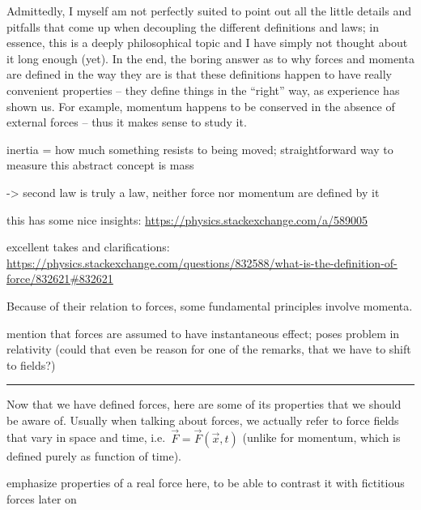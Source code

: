 \documentclass[../class_mech_main.tex]{subfiles}
\begin{document}
Admittedly, I myself am not perfectly suited to point out all the little details and pitfalls that come up when decoupling the different definitions and laws; in essence, this is a deeply philosophical topic and I have simply not thought about it long enough (yet). In the end, the boring answer as to why forces and momenta are defined in the way they are is that these definitions happen to have really convenient properties -- they define things in the \enquote{right} way, as experience has shown us. For example, momentum happens to be conserved in the absence of external forces -- thus it makes sense to study it.


inertia = how much something resists to being moved; straightforward way to measure this abstract concept is mass


-> second law is truly a law, neither force nor momentum are defined by it


this has some nice insights: \url{https://physics.stackexchange.com/a/589005}


excellent takes and clarifications: \url{https://physics.stackexchange.com/questions/832588/what-is-the-definition-of-force/832621#832621}



Because of their relation to forces, some fundamental principles involve momenta. 



mention that forces are assumed to have instantaneous effect; poses problem in relativity (could that even be reason for one of the remarks, that we have to shift to fields?)


\hrule


Now that we have defined forces, here are some of its properties that we should be aware of. Usually when talking about forces, we actually refer to force fields that vary in space and time, i.e.~$\vec{F} = \vec{F}(\vec{x}, t)$ (unlike for momentum, which is defined purely as function of time).


emphasize properties of a real force here, to be able to contrast it with fictitious forces later on


\end{document}
